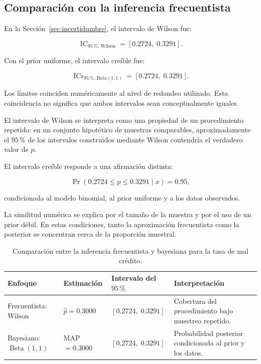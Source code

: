 \subsection{Comparación con la inferencia frecuentista}

En la Sección~\ref{sec:incertidumbre}, el intervalo de Wilson fue:

\[
\operatorname{IC}_{95\,\%,\,\mathrm{Wilson}}
=
[0.2724,\;0.3291].
\]

Con el prior uniforme, el intervalo creíble fue:

\[
\operatorname{ICr}_{95\,\%,\,\mathrm{Beta}(1,1)}
=
[0.2724,\;0.3291].
\]

Los límites coinciden numéricamente al nivel de redondeo utilizado. Esta
coincidencia no significa que ambos intervalos sean conceptualmente
iguales.

El intervalo de Wilson se interpreta como una propiedad de un
procedimiento repetido: en un conjunto hipotético de muestras comparables,
aproximadamente el \(95\,\%\) de los intervalos construidos mediante
Wilson contendría el verdadero valor de \(p\).

El intervalo creíble responde a una afirmación distinta:

\[
\Pr
\left(
    0.2724
    \leq
    p
    \leq
    0.3291
    \mid x
\right)
=
0.95,
\]

condicionada al modelo binomial, al prior uniforme y a los datos
observados.

La similitud numérica se explica por el tamaño de la muestra y por el uso
de un prior débil. En estas condiciones, tanto la aproximación
frecuentista como la posterior se concentran cerca de la proporción
muestral.

\begin{table}[H]
    \centering
    \caption{Comparación entre la inferencia frecuentista y bayesiana
    para la tasa de mal crédito.}
    \label{tab:comparacion-frecuentista-bayes}

    \begin{tabularx}{0.94\textwidth}{
        @{}
        >{\raggedright\arraybackslash}p{3.5cm}
        >{\centering\arraybackslash}p{2.2cm}
        >{\centering\arraybackslash}p{3.0cm}
        X
        @{}
    }
        \toprule
        Enfoque
        & Estimación
        & Intervalo del \(95\,\%\)
        & Interpretación \\
        \midrule

        Frecuentista: Wilson
        & \(\widehat{p}=0.3000\)
        & \([0.2724,\;0.3291]\)
        & Cobertura del procedimiento bajo muestreo repetido. \\

        Bayesiano:
        \(\operatorname{Beta}(1,1)\)
        & MAP \(=0.3000\)
        & \([0.2724,\;0.3291]\)
        & Probabilidad posterior condicionada al prior y los datos. \\

        \bottomrule
    \end{tabularx}
\end{table}

